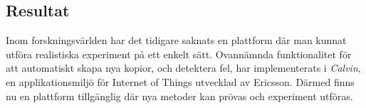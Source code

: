 \documentclass{article}
\begin{document}
\begin{multicols}{2}
\section*{Resultat}
Inom forskningsvärlden har det tidigare saknats en plattform där man kunnat utföra realistiska experiment på ett enkelt sätt. Ovannämnda funktionalitet för att automatiskt skapa nya kopior, och detektera fel, har implementerats i \emph{Calvin}, en applikationsmiljö för Internet of Things utvecklad av Ericsson. Därmed finns nu en plattform tillgänglig där nya metoder kan prövas och experiment utföras.

\end{multicols}
\end{document}
